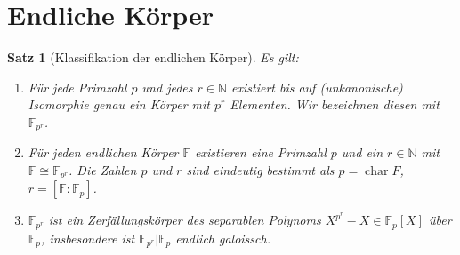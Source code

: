 \documentclass[a4paper, twoside, 11pt, ngerman]{report}
\newcommand{\FF}{\mathds F}
\newcommand{\NN}{\mathds N}
\DeclareMathOperator{\charact}{char}
\theoremstyle{definistyle}
\newtheorem{satz}{Satz}[section]
\theoremstyle{remark}
\begin{document}
\section{Endliche Körper}

\begin{satz}[Klassifikation der endlichen Körper]\label{satz:klassifikation_endliche_koerper}
Es gilt:
\begin{enumerate}
    \item[(a)] Für jede Primzahl $p$ und jedes $r \in \NN$ existiert bis auf (unkanonische) Isomorphie genau ein Körper mit $p^r$ Elementen. Wir bezeichnen diesen mit $\FF_{p^r}$.
    \item[(b)] Für jeden endlichen Körper $\FF$ existieren eine Primzahl $p$ und ein $r \in \NN$ mit $\FF \cong \FF_{p^r}$.  
    Die Zahlen $p$ und $r$ sind eindeutig bestimmt als $p = \charact F$, $r = [\FF : \FF_p]$.
    \item[(c)] $\FF_{p^r}$ ist ein Zerfällungskörper des separablen Polynoms $X^{p^r} - X \in \FF_p[X]$ über $\FF_p$, insbesondere ist $\FF_{p^r}|\FF_p$ endlich galoissch.
\end{enumerate}
\end{satz}
\end{document}
